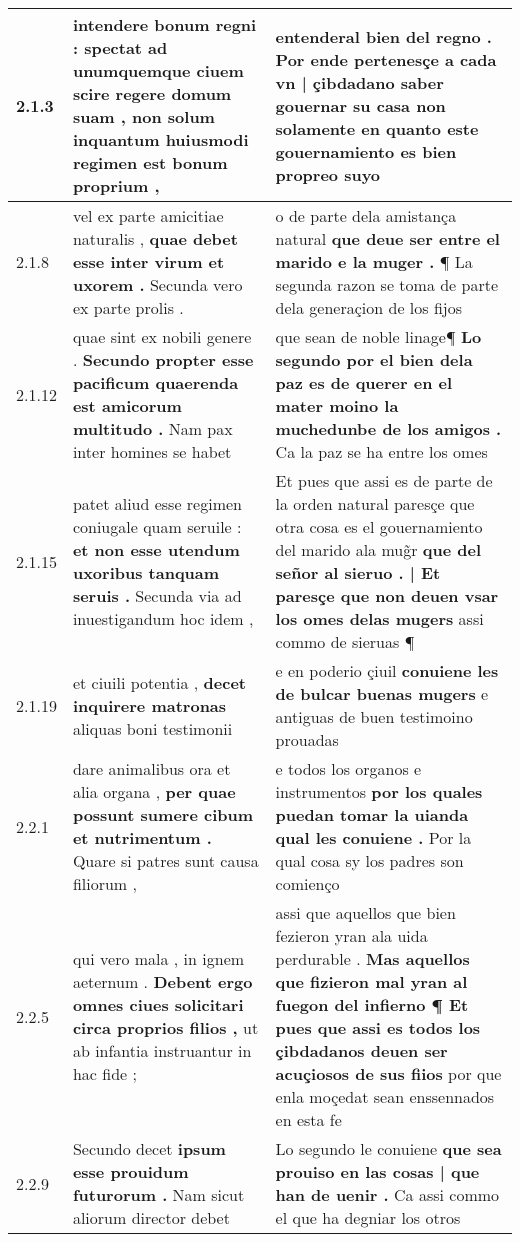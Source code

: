 \begin{tabular}{|p{1cm}|p{6.5cm}|p{6.5cm}|}
2.1.3 & intendere bonum regni : \textbf{ spectat ad unumquemque ciuem scire regere domum suam , } non solum inquantum huiusmodi regimen est bonum proprium , & entenderal bien del regno . \textbf{ Por ende pertenesçe a cada vn | çibdadano saber gouernar su casa } non solamente en quanto este gouernamiento es bien propreo suyo \\\hline
2.1.8 & vel ex parte amicitiae naturalis , \textbf{ quae debet esse inter virum et uxorem . } Secunda vero ex parte prolis . & o de parte dela amistança natural \textbf{ que deue ser entre el marido e la muger . } ¶ La segunda razon se toma de parte dela generaçion de los fijos \\\hline
2.1.12 & quae sint ex nobili genere . \textbf{ Secundo propter esse pacificum quaerenda est amicorum multitudo . } Nam pax inter homines se habet & que sean de noble linage¶ \textbf{ Lo segundo por el bien dela paz es de querer en el mater moino la muchedunbe de los amigos . } Ca la paz se ha entre los omes \\\hline
2.1.15 & patet aliud esse regimen coniugale quam seruile : \textbf{ et non esse utendum uxoribus tanquam seruis . } Secunda via ad inuestigandum hoc idem , & Et pues que assi es de parte de la orden natural paresçe que otra cosa es el gouernamiento del marido ala mug̃r \textbf{ que del señor al sieruo . | Et paresçe que non deuen vsar los omes delas mugers } assi commo de sieruas ¶ \\\hline
2.1.19 & et ciuili potentia , \textbf{ decet inquirere matronas } aliquas boni testimonii & e en poderio çiuil \textbf{ conuiene les de bulcar buenas mugers } e antiguas de buen testimoino prouadas \\\hline
2.2.1 & dare animalibus ora et alia organa , \textbf{ per quae possunt sumere cibum et nutrimentum . } Quare si patres sunt causa filiorum , & e todos los organos e instrumentos \textbf{ por los quales puedan tomar la uianda qual les conuiene . } Por la qual cosa sy los padres son comienço \\\hline
2.2.5 & qui vero mala , in ignem aeternum . \textbf{ Debent ergo omnes ciues solicitari circa proprios filios , } ut ab infantia instruantur in hac fide ; & assi que aquellos que bien fezieron yran ala uida perdurable . \textbf{ Mas aquellos que fizieron mal yran al fuegon del infierno ¶ Et pues que assi es todos los çibdadanos deuen ser acuçiosos de sus fiios } por que enla moçedat sean enssennados en esta fe \\\hline
2.2.9 & Secundo decet \textbf{ ipsum esse prouidum futurorum . } Nam sicut aliorum director debet & Lo segundo le conuiene \textbf{ que sea prouiso en las cosas | que han de uenir . } Ca assi commo el que ha degniar los otros \\\hline

\end{tabular}
